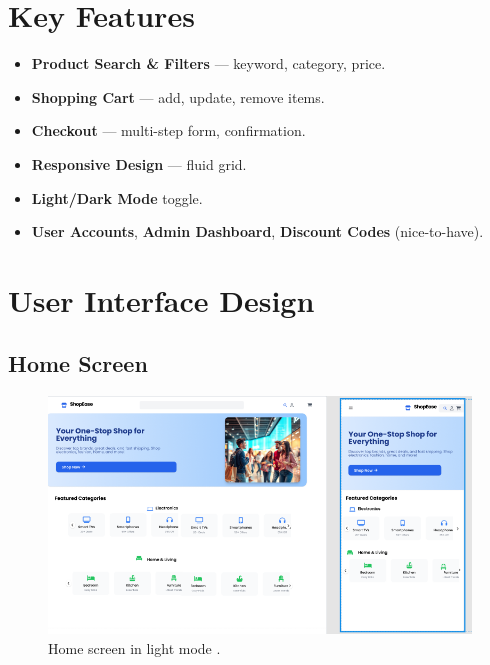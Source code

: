 \documentclass[11pt,a4paper]{article}
\begin{document}
	\section{Key Features}\label{sec:key-features}
	\begin{itemize}
		\item \textbf{Product Search \& Filters} — keyword, category, price.
		\item \textbf{Shopping Cart} — add, update, remove items.
		\item \textbf{Checkout} — multi-step form, confirmation.
		\item \textbf{Responsive Design} — fluid grid.
		\item \textbf{Light/Dark Mode} toggle.
		\item \textbf{User Accounts}, \textbf{Admin Dashboard}, \textbf{Discount Codes} (nice-to-have).
	\end{itemize}
	
\section{User Interface Design}\label{sec:user-interface-design}

\subsection{Home Screen}\label{subsec:home-screen}

	\begin{figure}[H]
	\centering
	\includegraphics[width=\linewidth]{pictures/main/Home_figma}%
	\caption{Home screen in light mode .}
	\label{fig:ui-home}
\end{figure}
\end{document}
